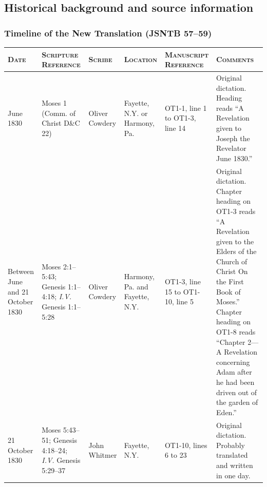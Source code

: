 \subsection{Historical background and source information}
	\label{JST-HB}
	
\pagebreak{}

\begin{landscape}

	\subsubsection{Timeline of the New Translation (JSNTB 57--59)}
		\label{JST-TIMELINE}
	
		\scriptsize
	
		\begin{longtable}{p{1in}p{1.5in}p{1in}p{0.75in}p{1.5in}p{3in}}
			
			\textbf{\textsc{Date}} & \textbf{\textsc{Scripture Reference}} & \textbf{\textsc{Scribe}} & \textbf{\textsc{Location}} & \textbf{\textsc{Manuscript Reference}} & \textbf{\textsc{Comments}} \\ \hline
			
			June 1830 & Moses 1 (Comm. of Christ D\&C 22) & Oliver Cowdery & Fayette, N.Y. or Harmony, Pa. & OT1-1, line 1 to OT1-3, line 14 & Original dictation. Heading reads ``A Revelation given to Joseph the Revelator June 1830.'' \\ \hline
			
			Between June and 21 October 1830 & Moses 2:1--5:43; Genesis 1:1--4:18; \textit{I.V.} Genesis 1:1--5:28 & Oliver Cowdery & Harmony, Pa. and Fayette, N.Y. & OT1-3, line 15 to OT1-10, line 5 & Original dictation. Chapter heading on OT1-3 reads ``A Revelation given to the Elders of the Church of Christ On the First Book of Moses.'' Chapter heading on OT1-8 reads ``Chapter 2---A Revelation concerning Adam after he had been driven out of the garden of Eden.'' \\ \hline
			
			21 October 1830 & Moses 5:43--51; Genesis 4:18--24; \textit{I.V.} Genesis 5:29--37 & John Whitmer & Fayette, N.Y. & OT1-10, lines 6 to 23 & Original dictation. Probably translated and written in one day. \\ \hline
			

\end{longtable}
\end{landscape}
